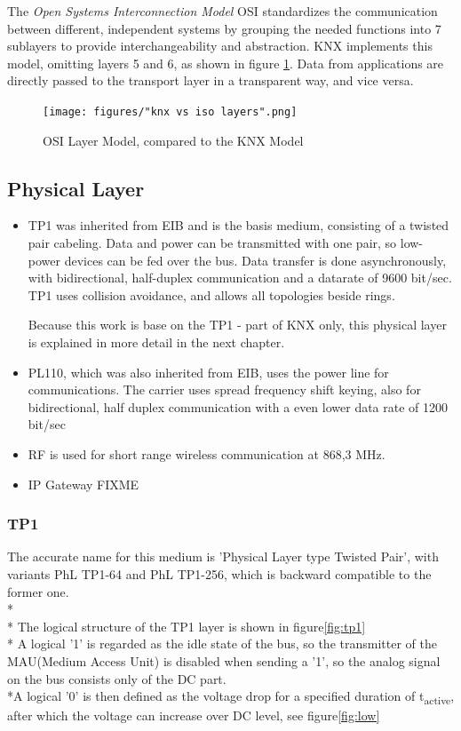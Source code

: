 The \textit{Open Systems Interconnection Model} OSI standardizes the communication between different, independent systems
by grouping the needed functions into 7 sublayers to provide interchangeability and abstraction. KNX implements this model, omitting 
layers 5 and 6, as shown in figure \ref{fig:knxlayers}. Data from applications are directly passed to the transport layer in a transparent way, and vice versa.

\begin{figure}
    \centering
    \texttt{[image: figures/"knx vs iso layers".png]}
    \caption{OSI Layer Model, compared to the KNX Model}
    \label{fig:knxlayers}
\end{figure}

\subsection{Physical Layer}

\begin{itemize}
 \item TP1 was inherited from EIB and is the basis medium, consisting of a twisted pair 
 cabeling. Data and power can be transmitted with one pair, so low-power devices can be
 fed over the bus. Data transfer is done asynchronously, with bidirectional, half-duplex
 communication and a datarate of 9600 bit/sec. TP1 uses collision avoidance, and allows
 all topologies beside rings. 
 
 Because this work is base on the TP1 - part of KNX only, this physical layer is explained
in more detail in the next chapter.

 \item PL110, which was also inherited from EIB, uses the power line for communications.
 The carrier uses spread frequency shift keying, also for bidirectional, half duplex 
 communication with a even lower data rate of 1200 bit/sec
 
 \item RF is used for short range wireless communication at 868,3 MHz. 

 \item IP Gateway FIXME
\end{itemize}

\subsubsection{TP1}

The accurate name for this medium is 'Physical Layer type Twisted Pair', with variants
PhL TP1-64 and PhL TP1-256, which is backward compatible to the former one.
\\*
\\*
The logical structure of the TP1 layer is shown in figure\ref{fig:tp1}
\\*
A logical '1' is regarded as the idle state of the bus, so the transmitter
of the MAU(Medium Access Unit) is disabled when sending a '1', so the analog signal on
the bus consists only of the DC part.
\\*A logical '0' is then defined as the voltage drop for a specified duration of t\textsubscript{active},
after which the voltage can increase over DC level, see figure\ref{fig:low}

